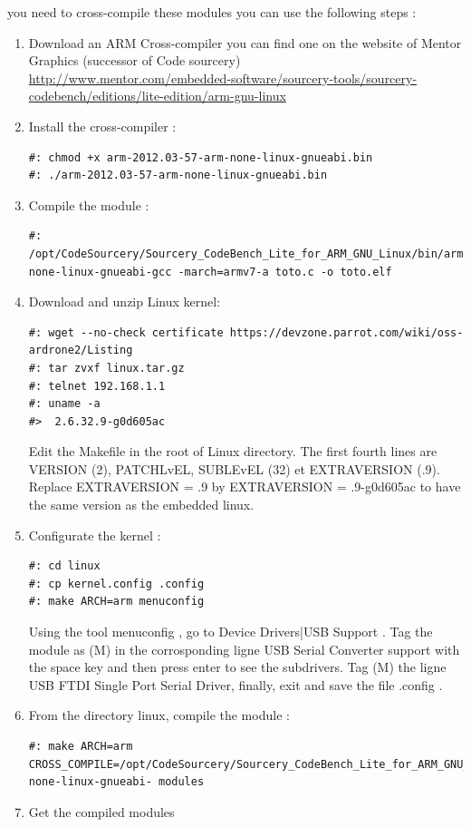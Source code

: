 you need to cross-compile these modules you can use the following steps :
\begin{enumerate}
\item Download an ARM Cross-compiler you can find one on the website of Mentor Graphics (successor of Code sourcery)\\ 
\url{http://www.mentor.com/embedded-software/sourcery-tools/sourcery-codebench/editions/lite-edition/arm-gnu-linux}
\item Install the cross-compiler :

\begin{lstlisting}
#: chmod +x arm-2012.03-57-arm-none-linux-gnueabi.bin
#: ./arm-2012.03-57-arm-none-linux-gnueabi.bin
\end{lstlisting}
\item Compile the module :
\begin{lstlisting}
#: /opt/CodeSourcery/Sourcery_CodeBench_Lite_for_ARM_GNU_Linux/bin/arm-none-linux-gnueabi-gcc -march=armv7-a toto.c -o toto.elf
\end{lstlisting}
\item Download and unzip Linux kernel: 
\begin{lstlisting}
#: wget --no-check certificate https://devzone.parrot.com/wiki/oss-ardrone2/Listing
#: tar zvxf linux.tar.gz
#: telnet 192.168.1.1
#: uname -a
#>  2.6.32.9-g0d605ac
\end{lstlisting}
Edit the Makefile in the root of Linux directory. The first fourth lines are VERSION (2), PATCHLvEL,  
SUBLEvEL (32) et EXTRAVERSION (.9).
Replace EXTRAVERSION = .9 by EXTRAVERSION = .9-g0d605ac to have the same version as the embedded linux.
\item Configurate the kernel :
\begin{lstlisting}
#: cd linux
#: cp kernel.config .config
#: make ARCH=arm menuconfig
\end{lstlisting}
Using the tool menuconfig , go to Device Drivers|USB Support . Tag the module as (M) in the corrosponding  ligne  USB Serial Converter 
support with the space key and then press enter to see the subdrivers. Tag (M) the ligne USB FTDI Single Port Serial Driver, finally, exit and save the file .config .
\item From the directory linux, compile the module :
\begin{lstlisting}
#: make ARCH=arm CROSS_COMPILE=/opt/CodeSourcery/Sourcery_CodeBench_Lite_for_ARM_GNU_Linux/bin/arm-none-linux-gnueabi- modules
\end{lstlisting}
\item Get  the compiled modules

\end{enumerate}
